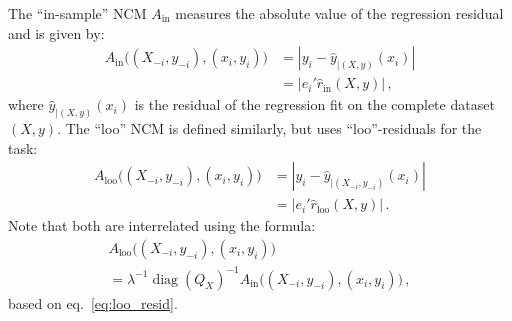 \documentclass[a4paper,14pt]{extarticle}
\newcommand{\diag}{\mathop{\text{diag}}\nolimits}
\begin{document}
The ``in-sample'' NCM $A_{\text{in}}$ measures the absolute value of the regression
residual and is given by:
\begin{align}
  A_{\text{in}}\bigl((X_{-i}, y_{-i}), (x_i, y_i)\bigr)
    &= |y_i - \hat{y}_{|(X, y)}(x_i)| \nonumber\\
    &= |e_i' \hat{r}_{\text{in}}(X, y)| \label{eq:ins_ncm}
    \,,
\end{align}
where $\hat{y}_{|(X, y)}(x_i)$ is the residual of the regression fit on the complete
dataset $(X, y)$. The ``loo'' NCM is defined similarly, but uses ``loo''-residuals
for the task:
\begin{align*}
  A_{\text{loo}}\bigl((X_{-i}, y_{-i}), (x_i, y_i)\bigr)
    &= |y_i - \hat{y}_{|(X_{-i}, y_{-i})}(x_i)| \\
    &= |e_i' \hat{r}_{\text{loo}}(X, y)|
    \,.
\end{align*}
Note that both are interrelated using the formula:
\begin{multline*}
  A_{\text{loo}}\bigl((X_{-i}, y_{-i}), (x_i, y_i)\bigr)
    \\ = \lambda^{-1} \diag(Q_X)^{-1}
    A_{\text{in}}\bigl((X_{-i}, y_{-i}), (x_i, y_i)\bigr)
    \,,
\end{multline*}
based on eq.~\ref{eq:loo_resid}.
\end{document}
